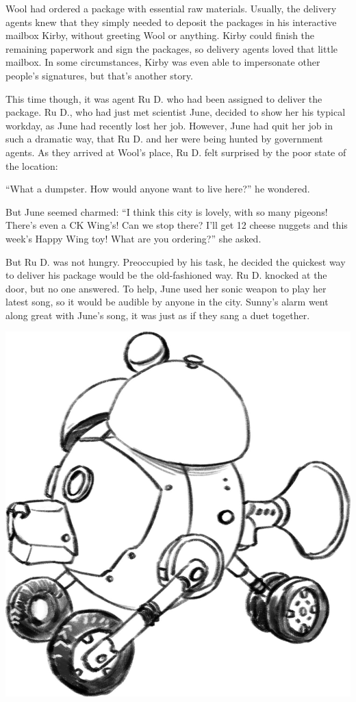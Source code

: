 Wool had ordered a package with essential raw materials.
Usually, the delivery agents knew that they simply needed to deposit the packages in his interactive mailbox Kirby, without greeting Wool or anything. Kirby could finish the remaining paperwork and sign the packages, so delivery agents loved that little mailbox. In some circumstances, Kirby was even able to impersonate other people's signatures, but that's another story.


This time though, it was agent Ru D. who had been assigned to deliver the package. 
Ru D., who had just met scientist June, decided to show her his typical workday, as June had recently lost her job.
However, June had quit her job in such a dramatic way, that Ru D. and her were being hunted by government agents.
As they arrived at Wool's place, Ru D. felt surprised by the poor state of the location: 

``What a dumpster. How would anyone want to live here?'' he wondered. 

But June seemed charmed: ``I think this city is lovely, with so many pigeons! There's even a CK Wing's! Can we stop there? I'll get 12 cheese nuggets and this week's Happy Wing toy! What are you ordering?'' she asked.

But Ru D. was not hungry. Preoccupied by his task, he decided the quickest way to deliver his package would be the old-fashioned way. 
Ru D. knocked at the door, but no one answered. To help, June used her sonic weapon to play her latest song, so it would be audible by anyone in the city.
Sunny's alarm went along great with June's song, it was just as if they sang a duet together.

\begin{center}
    \includegraphics[height=.2\textheight]{Assets/wfbw_sunny}    
\end{center}


